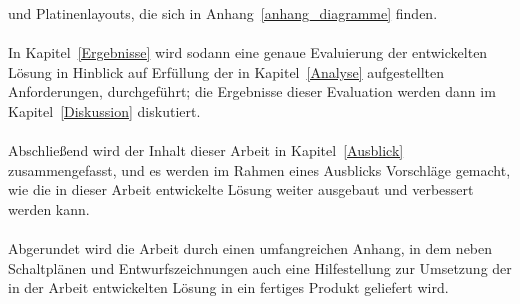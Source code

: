 und Platinenlayouts, die sich in Anhang~\ref{anhang_diagramme} finden.\\
\\
In Kapitel~\ref{Ergebnisse} wird sodann eine genaue Evaluierung der entwickelten Lösung 
in Hinblick auf Erfüllung der in Kapitel~\ref{Analyse} aufgestellten Anforderungen, 
durchgeführt; die Ergebnisse dieser Evaluation werden dann im Kapitel~\ref{Diskussion}
diskutiert.\\
\\
Abschließend wird der Inhalt dieser Arbeit in Kapitel~\ref{Ausblick} zusammengefasst,
und es werden im Rahmen eines Ausblicks Vorschläge gemacht, wie die in dieser Arbeit entwickelte
Lösung weiter ausgebaut und verbessert werden kann.\\
\\
Abgerundet wird die Arbeit durch einen umfangreichen Anhang, in dem neben Schaltplänen und 
Entwurfszeichnungen auch eine Hilfestellung zur Umsetzung der in der Arbeit entwickelten
Lösung in ein fertiges Produkt geliefert wird.
